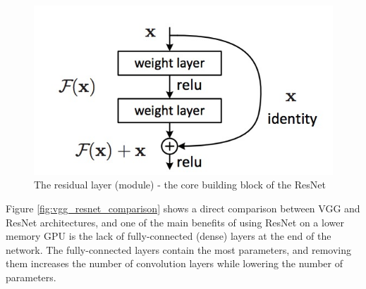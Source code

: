 \documentclass[times, utf8, diplomski]{fer}
\begin{document}
\begin{figure}
  \includegraphics[scale=0.55]{figures/resiudal_layer.jpg}
  \centering
  \caption{The residual layer (module) - the core building block of the ResNet }
  \label{fig:residual_layer}
\end{figure}

Figure \ref{fig:vgg_resnet_comparison} shows a direct comparison between VGG and ResNet architectures, and one of the main benefits of using ResNet on a lower memory GPU is the lack of fully-connected (dense) layers at the end of the network. The fully-connected layers contain the most parameters, and removing them increases the number of convolution layers while lowering the number of parameters.
\end{document}
